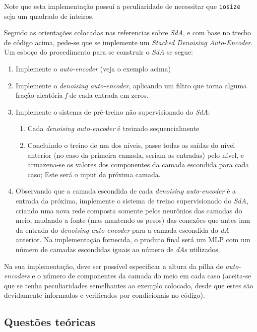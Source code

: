 \documentclass[12pt, a4paper]{article}
\begin{document}
Note que esta implementação possui a peculiaridade de necessitar que \texttt{iosize} seja um quadrado de inteiros.

Seguido as orientações colocadas nas referencias sobre \emph{SdA}, e com base no trecho de código acima, pede-se que se implemente um \emph{Stacked Denoising Auto-Encoder}. Um esboço do procedimento para se construir o \emph{SdA} se segue:
\begin{enumerate}
\item Implemente o \emph{auto-encoder} (veja o exemplo acima)
\item Implemente o \emph{denoising auto-encoder}, aplicando um filtro que torna alguma fração aleatória \emph{f} de cada entrada em zeros.
\item Implemente o sistema de pré-treino não supervisionado do \emph{SdA}:
	\begin{enumerate}
	\item Cada \emph{denoising auto-encoder} é treinado sequencialmente
	\item Concluindo o treino de um dos níveis, passe todas as saídas do nível anterior (no caso da primeira camada, seriam as entradas) pelo nível, e armazena-se os valores dos componentes da camada escondida para cada caso; Este será o input da próxima camada.
	\end{enumerate}
\item Observando que a camada escondida de cada \emph{denoising auto-encoder} é a entrada da próxima, implemente o sistema de treino supervisionado do \emph{SdA}, criando uma nova rede composta somente pelos neurônios das camadas do meio, mudando a fonte (mas mantendo os pesos) das conexões que antes iam da entrada do \emph{denoising auto-encoder} para a camada escondida do \emph{dA} anterior. Na implementação fornecida, o produto final será um MLP com um número de camadas escondidas iguais ao número de \emph{dAs} utilizados.
\end{enumerate}

Na sua implementação, deve ser possível especificar a altura da pilha de \emph{auto-encoders} e o número de componentes da camada do meio em cada caso (aceita-se que se tenha peculiaridades semelhantes ao exemplo colocado, desde que estes são devidamente informados e verificados por condicionais no código).
	
\subsection{Questões teóricas}
\end{document}

